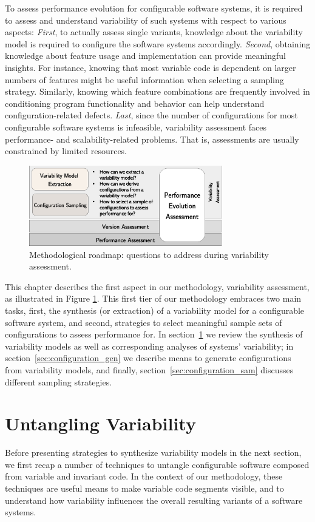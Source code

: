To assess performance evolution for configurable software systems, it is
required to assess and understand variability of such systems with respect to
various aspects: \emph{First}, to actually assess single variants, knowledge
about the variability model is required to configure the software systems accordingly.
\emph{Second}, obtaining knowledge about feature usage and implementation can
provide meaningful insights. For instance, knowing that most variable code is dependent
on larger numbers of features might be useful information when selecting a
sampling strategy. Similarly, knowing which feature combinations are frequently
involved in conditioning program functionality and behavior can help understand
configuration-related defects. \emph{Last}, since the number of configurations
for most configurable software systems is infeasible, variability assessment faces
performance- and scalability-related problems. That is, assessments are usually
constrained by limited resources.

\begin{figure}[h!]
	\centering
	\includegraphics[width=0.75\textwidth]{images/process_varassesment.eps}
	\caption{Methodological roadmap: questions to address during variability
	assessment.}
	\label{fig:roadmap_1}
\end{figure}
 
This chapter describes the first aspect in our methodology, variability
assessment, as illustrated in Figure \ref{fig:roadmap_1}. This first tier of our
methodology embraces two main tasks, first, the synthesis (or extraction) of a variability
model for a configurable software system, and second, strategies to select
meaningful sample sets of configurations to assess performance for. In
section~\ref{sec:untangling} we review the synthesis of variability models as
well as corresponding analyses of systems’ variability; in
section~\ref{sec:configuration_gen} we describe means to generate configurations from variability models, and finally,
section~\ref{sec:configuration_sam} discusses different sampling strategies.

\section{Untangling Variability}\label{sec:untangling}
{\color{gray}Before presenting strategies to synthesize variability models in
the next section, we first recap a number of techniques to untangle configurable
software composed from variable and invariant code. In the context of our
methodology, these techniques are useful means to make variable code segments
visible, and to understand how variability influences the overall resulting
variants of a software systems.}

